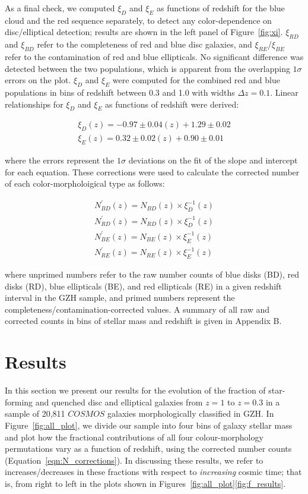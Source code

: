\documentclass[useAMS,usenatbib]{mn2e}
\begin{document}
As a final check, we computed $\xi_D$ and $\xi_E$ as functions of redshift for the blue cloud and the red sequence separately, to detect any color-dependence on disc/elliptical detection; results are shown in the left panel of Figure~\ref{fig:xi}. $\xi_{RD}$ and $\xi_{BD}$ refer to the completeness of red and blue disc galaxies, and $\xi_{RE}$/$\xi_{BE}$ refer to the contamination of red and blue ellipticals. No significant difference was detected between the two populations, which is apparent from the overlapping $1\sigma$ errors on the plot. $\xi_D$ and $\xi_E$ were computed for the combined red and blue populations in bins of redshift between 0.3 and 1.0 with widths $\Delta z = 0.1$. Linear relationships for $\xi_D$ and $\xi_E$ as functions of redshift were derived: 

\begin{align}
\xi_D(z) = -0.97 \pm 0.04 (z) + 1.29 \pm 0.02 \nonumber \\
\xi_E(z) = 0.32 \pm 0.02 (z) + 0.90 \pm 0.01
\label{eqn:xis}
\end{align}
 
\noindent where the errors represent the $1\sigma$ deviations on the fit of the slope and intercept for each equation. These corrections were used to calculate the corrected number of each color-morpholoigical type as follows:

\begin{align}
N^{'}_{BD}(z) = N_{BD}(z) \times \xi_D^{-1}(z) \nonumber \\
N^{'}_{RD}(z) = N_{RD}(z) \times \xi_D^{-1}(z) \nonumber \\
N^{'}_{BE}(z) = N_{BE}(z) \times \xi_E^{-1}(z) \nonumber \\
N^{'}_{RE}(z) = N_{RE}(z) \times \xi_E^{-1}(z) 
\label{eqn:N_corrections}
\end{align}

\noindent where unprimed numbers refer to the raw number counts of blue disks (BD), red disks (RD), blue ellipticals (BE), and red ellipticals (RE) in a given redshift interval in the GZH sample, and primed numbers represent the completeness/contamination-corrected values. A summary of all raw and corrected counts in bins of stellar mass and redshift is given in Appendix B. 

\section{Results}
\label{sec:results}
In this section we present our results for the evolution of the fraction of star-forming and quenched disc and elliptical galaxies from $z=1$ to $z=0.3$ in a sample of 20,811 $COSMOS$ galaxies morphologically classified in GZH. In Figure~\ref{fig:all_plot}, we divide our sample into four bins of galaxy stellar mass and plot how the fractional contributions of all four colour-morphology permutations vary as a function of redshift, using the corrected number counts (Equation~\ref{eqn:N_corrections}). In discussing these results, we refer to increases/decreases in these fractions with respect to \emph{increasing} cosmic time; that is, from right to left in the plots shown in Figures~\ref{fig:all_plot}\ref{fig:f_results}.
\end{document}
